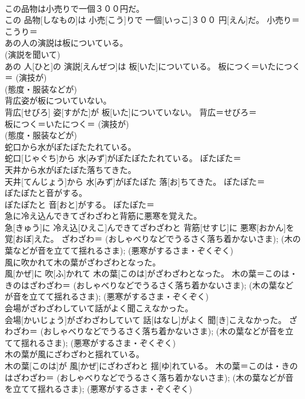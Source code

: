 \documentclass[8pt]{extreport}
\begin{document}
\begin{CJK}{UTF8}{min}
{\\	この品物は小売りで一個３００円だ。	
\\	この 品物[しなもの]は 小売[こう]りで 一個[いっこ]３００ 円[えん]だ。	小売り＝こうり＝ 
\\	あの人の演説は板についている。	
\\	(演説を聞いて) 
\\	あの 人[ひと]の 演説[えんぜつ]は 板[いた]についている。	板につく＝いたにつく＝ (演技が) 
\\	(態度・服装などが) 
\\	背広姿が板についていない。	
\\	背広[せびろ] 姿[すがた]が 板[いた]についていない。	背広＝せびろ＝ 
\\	板につく＝いたにつく＝ (演技が) 
\\	(態度・服装などが) 
\\	蛇口から水がぽたぽたたれている。	
\\	蛇口[じゃぐち]から 水[みず]がぽたぽたたれている。	ぽたぽた＝ 
\\	天井から水がぽたぽた落ちてきた。	
\\	天井[てんじょう]から 水[みず]がぽたぽた 落[お]ちてきた。	ぽたぽた＝ 
\\	ぽたぽたと音がする。	
\\	ぽたぽたと 音[おと]がする。	ぽたぽた＝ 
\\	急に冷え込んできてざわざわと背筋に悪寒を覚えた。	
\\	急[きゅう]に 冷え込[ひえこ]んできてざわざわと 背筋[せすじ]に 悪寒[おかん]を 覚[おぼ]えた。	ざわざわ＝ (おしゃべりなどでうるさく落ち着かないさま); (木の葉などが音を立てて揺れるさま); (悪寒がするさま・ぞくぞく)
\\	風に吹かれて木の葉がざわざわとなった。	
\\	風[かぜ]に 吹[ふ]かれて 木の葉[このは]がざわざわとなった。	木の葉＝このは・きのはざわざわ＝ (おしゃべりなどでうるさく落ち着かないさま); (木の葉などが音を立てて揺れるさま); (悪寒がするさま・ぞくぞく)
\\	会場がざわざわしていて話がよく聞こえなかった。	
\\	会場[かいじょう]がざわざわしていて 話[はなし]がよく 聞[き]こえなかった。	ざわざわ＝ (おしゃべりなどでうるさく落ち着かないさま); (木の葉などが音を立てて揺れるさま); (悪寒がするさま・ぞくぞく)
\\	木の葉が風にざわざわと揺れている。	
\\	木の葉[このは]が 風[かぜ]にざわざわと 揺[ゆ]れている。	木の葉＝このは・きのはざわざわ＝ (おしゃべりなどでうるさく落ち着かないさま); (木の葉などが音を立てて揺れるさま); (悪寒がするさま・ぞくぞく)
}
\end{CJK}
\end{document}
